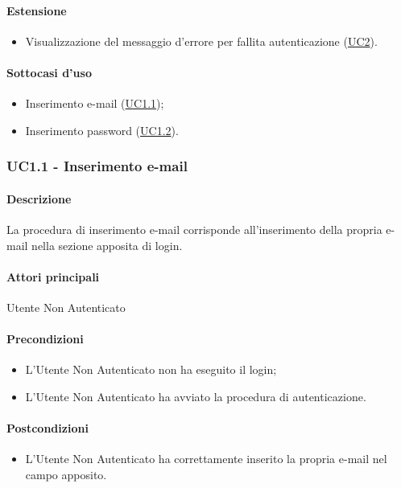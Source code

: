 \paragraph*{Estensione}
\begin{itemize}
  \item Visualizzazione del messaggio d’errore per fallita autenticazione (\hyperref[UC2]{UC2}).
\end{itemize}

\paragraph*{Sottocasi d'uso}
\begin{itemize}
  \item Inserimento e-mail (\hyperref[UC1point1]{UC1.1});
  \item Inserimento password (\hyperref[UC1point2]{UC1.2}).
\end{itemize}


\subsubsection{UC1.1 - Inserimento e-mail}\label{UC1point1}
\paragraph*{Descrizione}
La procedura di inserimento e-mail corrisponde all’inserimento della propria e-mail nella sezione apposita di login.

\paragraph*{Attori principali}
Utente Non Autenticato

\paragraph*{Precondizioni}
\begin{itemize}
  \item L’Utente Non Autenticato non ha eseguito il login;
  \item L’Utente Non Autenticato ha avviato la procedura di autenticazione.  
\end{itemize}

\paragraph*{Postcondizioni}
\begin{itemize}
  \item L’Utente Non Autenticato ha correttamente inserito la propria e-mail nel campo apposito.
\end{itemize}

